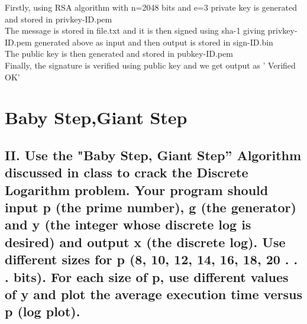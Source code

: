 \documentclass{article}
\begin{document}
\noindent Firstly, using RSA algorithm with n=2048 bits and e=3 private key is generated and stored in privkey-ID.pem\\

\noindent The message is stored in file.txt and it is then signed using sha-1 giving privkey-ID.pem generated above as input and then output is stored in sign-ID.bin\\

\noindent The public key is then generated and stored in pubkey-ID.pem \\

\noindent Finally, the signature is verified using public key and we get output as ' Verified OK'







\section*{Baby Step,Giant Step}
\subsection*{II. Use the "Baby Step, Giant Step” Algorithm discussed in class to crack the
Discrete Logarithm problem. Your program should input p (the prime number), g
(the generator) and y (the integer whose discrete log is desired) and output x
(the discrete log). Use different sizes for p (8, 10, 12, 14, 16, 18, 20 . . . bits).
For each size of p, use different values of y and plot the average execution time
versus p (log plot).}
\end{document}

